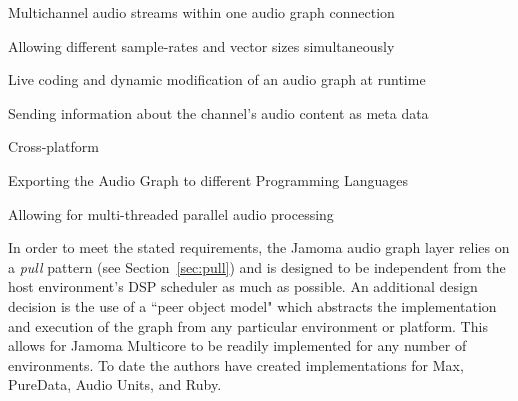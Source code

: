 \documentclass[twoside,a4paper]{article}
\newenvironment{packed_item}{
\begin{itemize}
  \setlength{\itemsep}{1pt}
  \setlength{\parskip}{0pt}
  \setlength{\parsep}{0pt}
}{\end{itemize}}
\begin{document}

\begin{packed_item}

\item{Multichannel audio streams within one audio graph connection}
\item{Allowing different sample-rates and vector sizes simultaneously}  
\item{Live coding and dynamic modification of an audio graph at runtime}    
\item{Sending information about the channel's audio content as meta data}  
\item{Cross-platform}
\item{Exporting the Audio Graph to different Programming Languages}
\item{Allowing for multi-threaded parallel audio processing}
 
\end{packed_item}	


In order to meet the stated requirements, the Jamoma audio graph layer relies on a \emph{pull} pattern (see Section~\ref{sec:pull}) and is designed to be independent from the host environment's DSP scheduler as much as possible.
An additional design decision is the use of a ``peer object model" which abstracts the implementation and execution of the graph from any particular environment or platform.  
This allows for Jamoma Multicore to be readily implemented for any number of environments.  
To date the authors have created implementations for Max, PureData, Audio Units, and Ruby.
\end{document}
